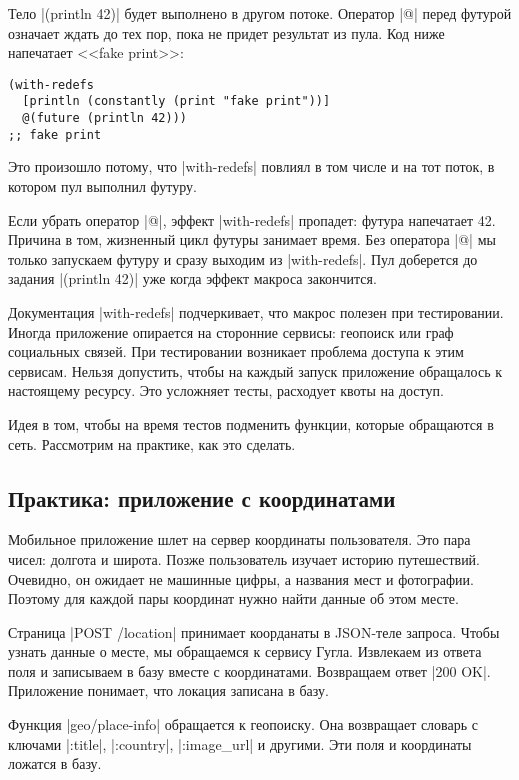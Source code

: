 Тело \spverb|(println 42)| будет выполнено в другом потоке. Оператор \spverb|@|
перед футурой означает ждать до тех пор, пока не придет результат из пула. Код
ниже напечатает <<fake print>>:

\begin{verbatim}
(with-redefs
  [println (constantly (print "fake print"))]
  @(future (println 42)))
;; fake print
\end{verbatim}

Это произошло потому, что \spverb|with-redefs| повлиял в том числе и на тот
поток, в котором пул выполнил футуру.

Если убрать оператор \spverb|@|, эффект \spverb|with-redefs| пропадет: футура
напечатает 42. Причина в том, жизненный цикл футуры занимает время. Без
оператора \spverb|@| мы только запускаем футуру и сразу выходим из
\spverb|with-redefs|. Пул доберется до задания \spverb|(println 42)| уже когда
эффект макроса закончится.

Документация \spverb|with-redefs| подчеркивает, что макрос полезен при
тестировании. Иногда приложение опирается на сторонние сервисы: геопоиск или
граф социальных связей. При тестировании возникает проблема доступа к этим
сервисам. Нельзя допустить, чтобы на каждый запуск приложение обращалось к
настоящему ресурсу. Это усложняет тесты, расходует квоты на доступ.

Идея в том, чтобы на время тестов подменить функции, которые обращаются в
сеть. Рассмотрим на практике, как это сделать.

\subsection{Практика: приложение с координатами}

Мобильное приложение шлет на сервер координаты пользователя. Это пара чисел:
долгота и широта. Позже пользователь изучает историю путешествий. Очевидно, он
ожидает не машинные цифры, а названия мест и фотографии. Поэтому для каждой пары
координат нужно найти данные об этом месте.

Страница \spverb|POST /location| принимает коорданаты в JSON-теле запроса. Чтобы
узнать данные о месте, мы обращаемся к сервису Гугла. Извлекаем из ответа поля и
записываем в базу вместе с координатами. Возвращаем ответ \spverb|200
OK|. Приложение понимает, что локация записана в базу.

Функция \spverb|geo/place-info| обращается к геопоиску. Она возвращает словарь с
ключами \spverb|:title|, \spverb|:country|, \spverb|:image_url| и другими. Эти
поля и координаты ложатся в базу.

